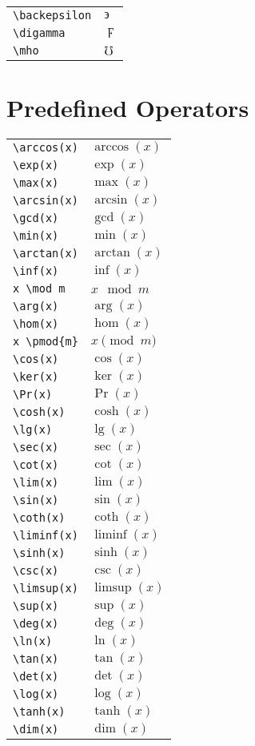 \documentclass[text,xhtml,itex]{internet}
\begin{document}
\begin{tabular}{ll}
\verb+\backepsilon+ & \(\backepsilon\) \\
\verb+\digamma+ & \(\digamma\) \\
\verb+\mho+ & \(\mho\)
\end{tabular}

\section{Predefined Operators}

\begin{tabular}{ll}
\verb+\arccos(x)+  & \(\arccos(x)\)  &\\
\verb+\exp(x)+    & \(\exp(x)\)     \\
\verb+\max(x)+    & \(\max(x)\)\\
\verb+\arcsin(x)+  & \(\arcsin(x)\)  \\
\verb+\gcd(x)+    & \(\gcd(x)\)     \\
\verb+\min(x)+    & \(\min(x)\)\\
\verb+\arctan(x)+  & \(\arctan(x)\)  \\
\verb+\inf(x)+    & \(\inf(x)\)     \\
\verb+x \mod m+  & \(x \mod m\)\\
\verb+\arg(x)+     & \(\arg(x)\)     \\
\verb+\hom(x)+    & \(\hom(x)\)     \\
\verb+x \pmod{m}+ & \(x \pmod{m}\)\\
\verb+\cos(x)+     & \(\cos(x)\)     \\
\verb+\ker(x)+    & \(\ker(x)\)     \\
\verb+\Pr(x)+     & \(\Pr(x)\)\\
\verb+\cosh(x)+    & \(\cosh(x)\)    \\
\verb+\lg(x)+     & \(\lg(x)\)      \\
\verb+\sec(x)+    & \(\sec(x)\)\\
\verb+\cot(x)+     & \(\cot(x)\)     \\
\verb+\lim(x)+    & \(\lim(x)\)     \\
\verb+\sin(x)+    & \(\sin(x)\)\\
\verb+\coth(x)+    & \(\coth(x)\)    \\
\verb+\liminf(x)+ & \(\liminf(x)\)  \\
\verb+\sinh(x)+   & \(\sinh(x)\)\\
\verb+\csc(x)+     & \(\csc(x)\)     \\
\verb+\limsup(x)+ & \(\limsup(x)\)  \\
\verb+\sup(x)+    & \(\sup(x)\)\\
\verb+\deg(x)+     & \(\deg(x)\)     \\
\verb+\ln(x)+     & \(\ln(x)\)      \\
\verb+\tan(x)+    & \(\tan(x)\)\\
\verb+\det(x)+     & \(\det(x)\)     \\
\verb+\log(x)+    & \(\log(x)\)     \\
\verb+\tanh(x)+   & \(\tanh(x)\)\\
\verb+\dim(x)+     & \(\dim(x)\)
\end{tabular}
\end{document}

